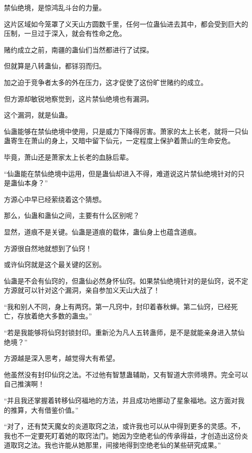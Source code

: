 
\begin{this_body}



禁仙绝境，是惊鸿乱斗台的力量。

这片区域如今笼罩了义天山方圆数千里，任何一位蛊仙进去其中，都会受到巨大的压制，一旦过于深入，就会有性命之危。

赌约成立之前，南疆的蛊仙们当然都进行了试探。

但就算是八转蛊仙，都铩羽而归。

加之迫于竞争者太多的外在压力，这才促使了这份旷世赌约的成立。

但方源却敏锐地察觉到，这片禁仙绝境也有漏洞。

这个漏洞，就是仙蛊。

仙蛊能够在禁仙绝境中使用，只是威力下降得厉害。萧家的太上长老，就将一只仙蛊寄生在萧山的身上，又暗中留下仙元，一定程度上保护着萧山的生命安危。

毕竟，萧山还是萧家太上长老的血脉后辈。

“仙蛊能在禁仙绝境中运用，但是蛊仙却进入不得，难道说这片禁仙绝境针对的只是蛊仙本身？”

方源心中早已经萦绕着这个猜想。

那么，仙蛊和蛊仙之间，主要有什么区别呢？

显然，道痕不是关键。仙蛊是道痕的载体，蛊仙身上也蕴含道痕。

方源很自然地就想到了仙窍！

或许仙窍就是这个最关键的区别。

仙蛊是不会有仙窍的，但蛊仙必然身怀仙窍。如果禁仙绝境针对的是仙窍，说不定方源就可以针对这个漏洞，亲自参加义天山大战了！

“我和别人不同，身上有两窍。第一凡窍中，封印着春秋蝉。第二仙窍，已经死亡，存放着绝大多数的蛊虫。”

“若是我能够将仙窍封锁封印。重新沦为凡人五转蛊师，是不是就能亲身进入禁仙绝境？”

方源越是深入思考，越觉得大有希望。

他虽然没有封印仙窍之法。不过他有智慧蛊辅助，又有智道大宗师境界。完全可以自己推演啊！

“并且我还掌握着转移仙窍福地的方法，并且成功地挪动了星象福地。这方面对我的推算，大有借鉴价值。”

“对了，还有焚天魔女的炎道取窍之法，或许我也可以从中得到更多的灵感。不，我也不一定要死盯着她的取窍法门。她因为空绝老仙的传承得益，才创造出这份炎道取窍之法。我也许能从她那里，间接地得到空绝老仙的某些研究成果。”


\end{this_body}
